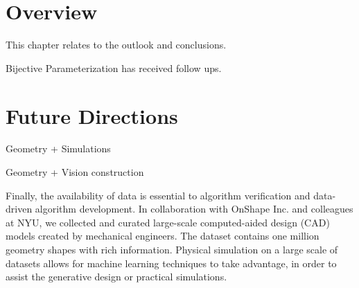 \section{Overview}
This chapter relates to the outlook and conclusions.

Bijective Parameterization has received follow ups.
\section{Future Directions}
Geometry + Simulations

Geometry + Vision construction

Finally, the availability of data is essential to algorithm verification and data-driven algorithm development. In collaboration with OnShape Inc. and colleagues at NYU, we collected and curated large-scale computed-aided design (CAD) models created by mechanical engineers. The dataset contains one million geometry shapes with rich information. 
Physical simulation on a large scale of datasets allows for machine learning techniques to take advantage, in order to assist the generative design or practical simulations.